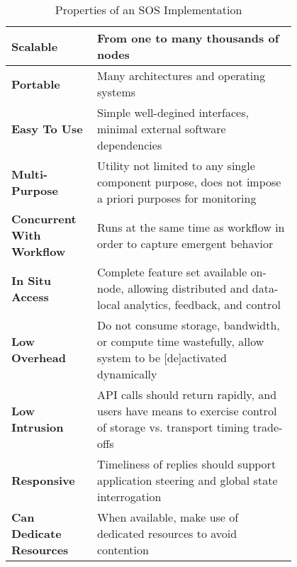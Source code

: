 

\begin{table*}[t]
\renewcommand{\arraystretch}{1.3}
\caption{Properties of an SOS Implementation}
\label{tabledesign}
\centering
\begin{tabular}{|p{0.2\linewidth}|p{0.6\linewidth}|}
\hline %
%
\textbf{Scalable}
&
From one to many thousands of nodes
\\
%
%
\hline %
%
\textbf{Portable}
&
Many architectures and operating systems
\\
%
%
\hline %
%
\textbf{Easy To Use}
& 
Simple well-degined interfaces, minimal external software dependencies
\\
%
%
\hline %
%
\textbf{Multi-Purpose}
&
Utility not limited to any single component purpose, does not impose
a priori purposes for monitoring
\\
%
%
\hline %
%
\textbf{Concurrent With Workflow}
&
Runs at the same time as workflow in order to capture emergent
behavior
\\
%
%
\hline %
%
\textbf{In Situ Access}
&
Complete feature set available on-node, allowing distributed and
data-local analytics, feedback, and control
\\
%
%
\hline %
%
\textbf{Low Overhead}
&
Do not consume storage, bandwidth, or compute time wastefully, allow
system to be [de]activated dynamically
\\
%
%
\hline %
%
\textbf{Low Intrusion}
&
API calls should return rapidly, and users have means to exercise
control of storage vs. transport timing trade-offs
\\
%
%
\hline %
%
\textbf{Responsive}
&
Timeliness of replies should support application steering and global
state interrogation
\\
%
%
\hline %
%
\textbf{Can Dedicate Resources}
&
When available, make use of dedicated resources to avoid contention
\\


\end{tabular}
\end{table*}
